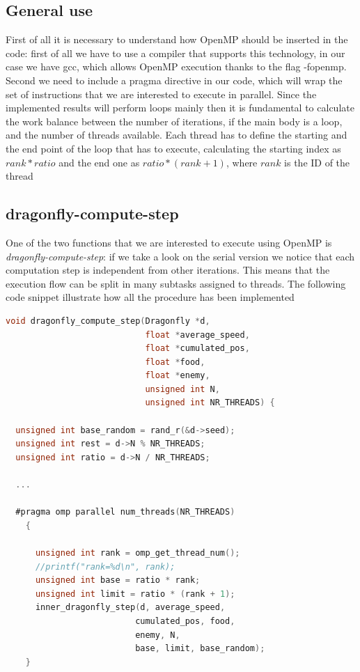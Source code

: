 \documentclass[10pt]{article}
\begin{document}
\begin{multicols}{2}
\subsection*{General use}

First of all it is necessary to understand how OpenMP should be inserted in the code: first of all we have to use 
a compiler that supports this technology, in our case we have gcc, which allows OpenMP execution thanks to the flag -fopenmp.
Second we need to include a pragma directive in our code, which will wrap the set of instructions that we are interested to execute
in parallel. Since the implemented results will perform loops mainly then it is fundamental to calculate the work balance between the number of iterations, if the main
body is a loop,
and the number of threads available. Each thread has to define the starting and the end point of the loop that has to execute,
calculating the starting index as $rank*ratio$ and the end one as $ratio*(rank+1)$, where $rank$ is the ID of the thread

\subsection*{dragonfly-compute-step}

One of the two functions that we are interested to execute using OpenMP is \textit{dragonfly-compute-step}:
if we take a look on the serial version we notice that each computation step is independent
from other iterations. This means that the execution flow can be split in many subtasks assigned
to threads. The following code snippet illustrate how all the procedure has been implemented

\begin{lstlisting}[language=C,caption={parallelized dragonfly-compute-step}]
void dragonfly_compute_step(Dragonfly *d, 
                            float *average_speed,
                            float *cumulated_pos, 
                            float *food, 
                            float *enemy, 
                            unsigned int N, 
                            unsigned int NR_THREADS) {

  unsigned int base_random = rand_r(&d->seed);
  unsigned int rest = d->N % NR_THREADS;
  unsigned int ratio = d->N / NR_THREADS;

  ...

  #pragma omp parallel num_threads(NR_THREADS)
    {
      
      unsigned int rank = omp_get_thread_num();
      //printf("rank=%d\n", rank);
      unsigned int base = ratio * rank;
      unsigned int limit = ratio * (rank + 1);
      inner_dragonfly_step(d, average_speed, 
                          cumulated_pos, food, 
                          enemy, N,
                          base, limit, base_random);
    }
  

\end{lstlisting}
\end{multicols}
\end{document}
